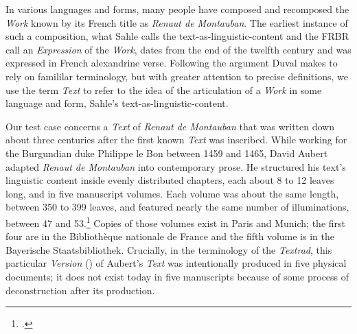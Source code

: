 In various languages and forms, many people have composed and recomposed the \textit{Work} known by its French title as \textit{Renaut de Montauban}. The earliest instance of such a composition, what Sahle calls the text-as-linguistic-content  and the FRBR call an \textit{Expression} of the \textit{Work}, dates from the end of the twelfth century and was expressed in French alexandrine verse. Following the argument Duval makes to rely on famililar terminology, but with greater attention to precise definitions, we use the term \textit{Text} to refer to the idea of the articulation of a \textit{Work} in some language and form, Sahle's text-as-linguistic-content.

Our test case concerns a \textit{Text} of \textit{Renaut de Montauban} that was written down about three centuries after the first known \textit{Text} was inscribed. While working for the Burgundian duke Philippe le Bon between 1459 and 1465, David Aubert adapted \textit{Renaut de Montauban} into contemporary prose. He structured his text's linguistic content inside evenly distributed chapters, each about 8 to 12 leaves long, and in five manuscript volumes. Each volume was about the same length, between 350 to 399 leaves, and featured nearly the same number of illuminations, between 47 and 53.\footcite[][]{Querel2007} Copies of those volumes exist in Paris and Munich; the first four are in the Bibliothèque nationale de France and the fifth volume is in the Bayerische Staatsbibliothek. Crucially, in the terminology of the \textit{Textrad}, this particular \textit{Version} () of Aubert's \textit{Text} was intentionally produced in five physical documents; it does not exist today in five manuscripts because of some process of deconstruction after its production.

